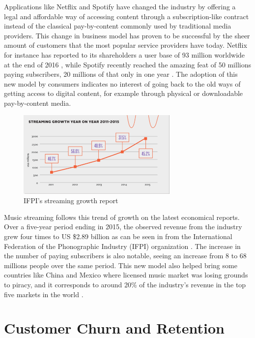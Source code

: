 \documentclass{kththesis}
\begin{document}
	Applications like Netflix and Spotify have changed the industry by offering a legal and affordable way of accessing content through a subscription-like contract instead of the classical pay-by-content commonly used by traditional media providers. This change in business model has proven to be successful by the sheer amount of customers that the most popular service providers have today. Netflix for instance has reported to its shareholders a user base of 93 million worldwide at the end of 2016 \citep{netflixsh}, while Spotify recently reached the amazing feat of 50 millions paying subscribers, 20 millions of that only in one year \citep{spotifypress}. The adoption of this new model by consumers indicates no interest of going back to the old ways of getting access to digital content, for example through physical or downloadable pay-by-content media.

	\begin{figure}[h]
    \centering
    \includegraphics[width=0.7\textwidth, natwidth=580bp, natheight=313bp]{figures/ifpi_stream_growth.png}
    \caption{IFPI's streaming growth report}
    \label{fig:ifpi-growth-report}
\end{figure}

	Music streaming follows this trend of growth on the latest economical reports. Over a five-year period ending in 2015, the observed revenue from the industry grew four times to US \$2.89 billion as can be seen in  from the International Federation of the Phonographic Industry (IFPI) organization \citep{ifpi}. The increase in the number of paying subscribers is also notable, seeing an increase from 8 to 68 millions people over the same period. This new model also helped bring some countries like China and Mexico where licensed music market was losing grounds to piracy, and it corresponds to around 20\% of the industry's revenue in the top five markets in the world \citep{ifpi}. 
	  
\section{Customer Churn and Retention} 
\end{document}
